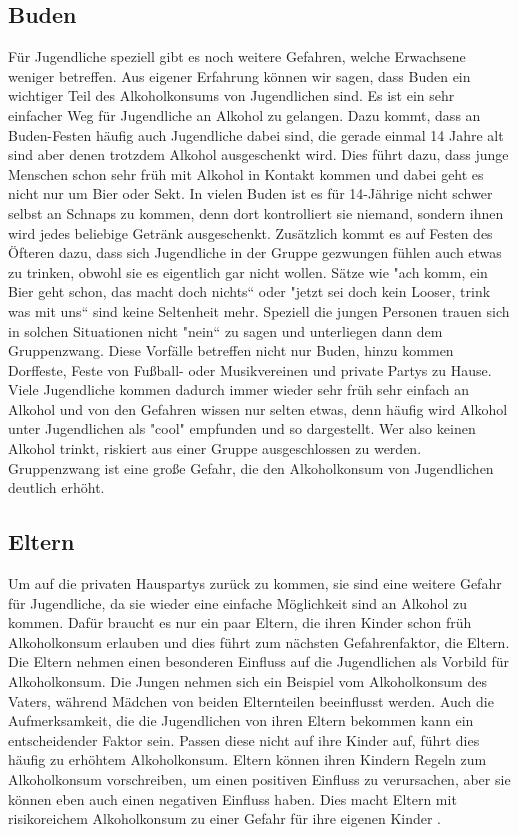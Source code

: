 \documentclass[12pt]{article}
\begin{document}
\subsection{Buden}
Für Jugendliche speziell gibt es noch weitere Gefahren, welche Erwachsene weniger betreffen. Aus eigener Erfahrung können wir sagen, dass Buden ein wichtiger Teil des Alkoholkonsums von Jugendlichen sind. Es ist ein sehr einfacher Weg für Jugendliche an Alkohol zu gelangen. Dazu kommt, dass an Buden-Festen häufig auch Jugendliche dabei sind, die gerade einmal 14 Jahre alt sind aber denen trotzdem Alkohol ausgeschenkt wird. Dies führt dazu, dass junge Menschen schon sehr früh mit Alkohol in Kontakt kommen und dabei geht es nicht nur um Bier oder Sekt. In vielen Buden ist es für 14-Jährige nicht schwer selbst an Schnaps zu kommen, denn dort kontrolliert sie niemand, sondern ihnen wird jedes beliebige Getränk ausgeschenkt. Zusätzlich kommt es auf Festen des Öfteren dazu, dass sich Jugendliche in der Gruppe gezwungen fühlen auch etwas zu trinken, obwohl sie es eigentlich gar nicht wollen. Sätze wie "ach komm, ein Bier geht schon, das macht doch nichts“ oder "jetzt sei doch kein Looser, trink was mit uns“ sind keine Seltenheit mehr. Speziell die jungen Personen trauen sich in solchen Situationen nicht "nein“ zu sagen und unterliegen dann dem Gruppenzwang. Diese Vorfälle betreffen nicht nur Buden, hinzu kommen Dorffeste, Feste von Fußball- oder Musikvereinen und private Partys zu Hause. Viele Jugendliche kommen dadurch immer wieder sehr früh sehr einfach an Alkohol und von den Gefahren wissen nur selten etwas, denn häufig wird Alkohol unter Jugendlichen als "cool" empfunden und so dargestellt. Wer also keinen Alkohol trinkt, riskiert aus einer Gruppe ausgeschlossen zu werden. Gruppenzwang ist eine große Gefahr, die den Alkoholkonsum von Jugendlichen deutlich erhöht.\\
\subsection{Eltern}
Um auf die privaten Hauspartys zurück zu kommen, sie sind eine weitere Gefahr für Jugendliche, da sie wieder eine einfache Möglichkeit sind an Alkohol zu kommen. Dafür braucht es nur ein paar Eltern, die ihren Kinder schon früh Alkoholkonsum erlauben und dies führt zum nächsten Gefahrenfaktor, die Eltern. Die Eltern nehmen einen besonderen Einfluss auf die Jugendlichen als Vorbild für Alkoholkonsum. Die Jungen nehmen sich ein Beispiel vom Alkoholkonsum des Vaters, während Mädchen von beiden Elternteilen beeinflusst werden. Auch die Aufmerksamkeit, die die Jugendlichen von ihren Eltern bekommen kann ein entscheidender Faktor sein. Passen diese nicht auf ihre Kinder auf, führt dies häufig zu erhöhtem Alkoholkonsum. Eltern können ihren Kindern Regeln zum Alkoholkonsum vorschreiben, um einen positiven Einfluss zu verursachen, aber sie können eben auch einen negativen Einfluss haben. Dies macht Eltern mit risikoreichem Alkoholkonsum zu einer Gefahr für ihre eigenen Kinder \autocite[27]{kuhn_empfehlungen_nodate}. \\
\end{document}
